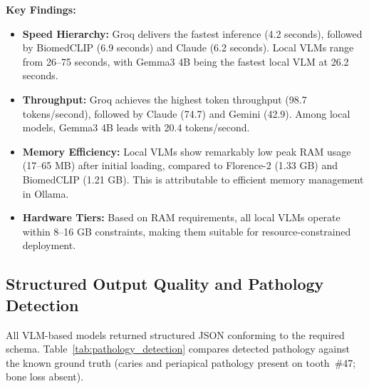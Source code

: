 \documentclass[12pt,a4paper]{report}
\begin{document}
	\textbf{Key Findings:}
	\begin{itemize}
		\item \textbf{Speed Hierarchy:} Groq delivers the fastest inference (4.2 seconds), followed by BiomedCLIP (6.9 seconds) and Claude (6.2 seconds). Local VLMs range from 26–75 seconds, with Gemma3 4B being the fastest local VLM at 26.2 seconds.
		\item \textbf{Throughput:} Groq achieves the highest token throughput (98.7 tokens/second), followed by Claude (74.7) and Gemini (42.9). Among local models, Gemma3 4B leads with 20.4 tokens/second.
		\item \textbf{Memory Efficiency:} Local VLMs show remarkably low peak RAM usage (17–65 MB) after initial loading, compared to Florence-2 (1.33 GB) and BiomedCLIP (1.21 GB). This is attributable to efficient memory management in Ollama.
		\item \textbf{Hardware Tiers:} Based on RAM requirements, all local VLMs operate within 8–16 GB constraints, making them suitable for resource-constrained deployment.
	\end{itemize}
	
	\subsection{Structured Output Quality and Pathology Detection}
	
	All VLM-based models returned structured JSON conforming to the required schema.
	Table~\ref{tab:pathology_detection} compares detected pathology against the known
	ground truth (caries and periapical pathology present on tooth~\#47; bone loss
	absent).
	
\end{document}
